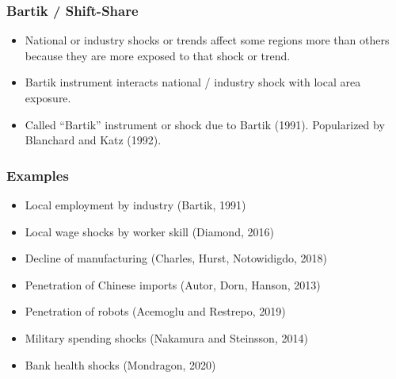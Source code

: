 \documentclass[english,xcolor=svgnames]{beamer}
\begin{document}
\begin{frame}
\frametitle[alignment=center]{Bartik / Shift-Share}
\begin{itemize}
	\item National or industry shocks or trends affect some regions more than others because they are more exposed to that shock or trend.
	\item Bartik instrument interacts national / industry shock with local area exposure.
	\item Called ``Bartik'' instrument or shock due to Bartik (1991). Popularized by Blanchard and Katz (1992).
\end{itemize}
\end{frame}

\begin{frame}
\frametitle[alignment=center]{Examples}
\begin{itemize}
	\item Local employment by industry (Bartik, 1991)
	\item Local wage shocks by worker skill (Diamond, 2016)
	\item Decline of manufacturing (Charles, Hurst, Notowidigdo, 2018)
	\item Penetration of Chinese imports (Autor, Dorn, Hanson, 2013)
	\item Penetration of robots (Acemoglu and Restrepo, 2019)
	\item Military spending shocks (Nakamura and Steinsson, 2014)
	\item Bank health shocks (Mondragon, 2020)
\end{itemize}
\end{frame}
\end{document}
